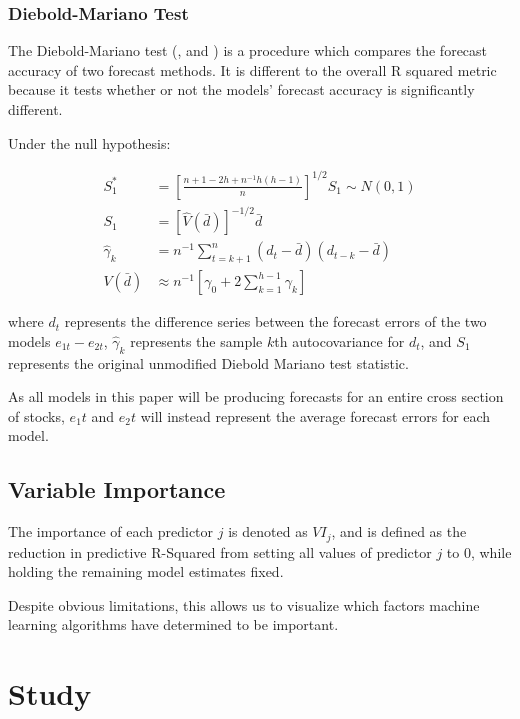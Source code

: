 \documentclass[a4paper]{article}
\newcommand{\smalltodo}[2][] {\todo[caption={#2}, size=\scriptsize,%
	fancyline,#1]{\begin{spacing}{.5}#2\end{spacing}}}
\newcommand{\rhs}[2][]{\smalltodo[color=green!30,#1]{{\bf RS:} #2}}
\begin{document}
	\subsubsection{Diebold-Mariano Test}
	
	The Diebold-Mariano test (\cite{diebold_comparing_2002}, and \cite{harvey_testing_1997}) is a procedure which compares the forecast accuracy of two forecast methods. It is different to the overall R squared metric because it tests whether or not the models' forecast accuracy is significantly different. 
	
	Under the null hypothesis:
	
	\begin{align}
	S_1^* &= \left[ 
	\frac{n + 1 - 2h + n^{-1}h(h-1)}
	{n} 
	\right]^{1/2}S_1 \sim N(0,1) \\
	S_1 &= \left[ 
	\hat{V}(\bar{d})
	\right] ^{-1/2}\bar{d} \\
	\hat{\gamma}_k &= n^{-1} \sum_{t = k + 1}^{n}(d_t - \bar{d})(d_{t-k} - \bar{d}) \\
	V(\bar{d}) &\approx n^{-1}\left[ 
	\gamma_0 + 2 \sum_{k = 1}^{h - 1}\gamma_k
	\right] 
	\end{align}
	
	where $d_t$ represents the difference series between the forecast errors of the two models $e_{1t} - e_{2t}$, $\hat{\gamma}_k$ represents the sample $k$th autocovariance for $d_t$, and $S_1$ represents the original unmodified Diebold Mariano test statistic.
	
	As all models in this paper will be producing forecasts for an entire cross section of stocks, $e_1t$ and $e_2t$ will instead represent the average forecast errors for each model.
	
	\subsection{Variable Importance}
	
	\rhs{Pending}
	
	The importance of each predictor $j$ is denoted as $VI_j$, and is defined as the reduction in predictive R-Squared from setting all values of predictor $j$ to 0, while holding the remaining model estimates fixed. 
	
	Despite obvious limitations, this allows us to visualize which factors machine learning algorithms have determined to be important.
	
	\section{Study}
	
\end{document}
